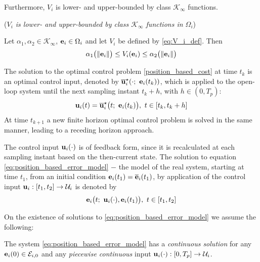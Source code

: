 Furthermore, $V_i$ is lower- and upper-bounded by class $\mathcal{K}_{\infty}$ functions.

\begin{bw_box}
  \begin{lemma} (\textit{$V_i$ is lower- and upper-bounded by class
      \label{lemma:V_i_lower_upper_bounded}
    $\mathcal{K}_{\infty}$ functions in $\Omega_i$})
  \end{lemma}

  Let $\alpha_1, \alpha_2 \in \mathcal{K}_{\infty}$, $\bm{\mathbf{e}}_i \in \Omega_i$
  and let $V_i$ be defined by \eqref{eq:V_i_def}. Then
  \begin{align}
    \alpha_1\big(\|\bm{\mathbf{e}}_i\|\big) \leq V_i(\bm{\mathbf{e}}_i) \leq \alpha_2\big(\| \bm{\mathbf{e}}_i \|\big)
  \end{align}

\end{bw_box}


The solution to the optimal control problem \eqref{position_based_cost}
at time $t_k$ is an optimal control input, denoted by
$\overline{\bm{\mathbf{u}}}_i^{\star}(\cdot;\ \bm{\mathbf{e}}_i(t_k))$, which
is applied to the open-loop system until the next sampling instant $t_k + h$,
with $h \in (0,T_p)$:
\begin{align}
  \bm{\mathbf{u}}_i(t) = \overline{\bm{\mathbf{u}}}_i^{\star}\big(t;\ \bm{\mathbf{e}}_i(t_k)\big),\  t \in [t_k, t_k + h]
 \label{eq:position_based_optimal_u}
\end{align}
At time $t_{k+1}$ a new finite horizon optimal control problem is solved in the
same manner, leading to a receding horizon approach.

The control input $\bm{\mathbf{u}}_i(\cdot)$ is of feedback form,
since it is recalculated at each sampling instant based on the then-current
state. The solution to equation \eqref{eq:position_based_error_model} $-$ the
model of the real system, starting at time $t_1$, from an initial condition
$\bm{\mathbf{e}}_i(t_1) = \overline{\bm{\mathbf{e}}}_i(t_1)$,
by application of the control input $\bm{\mathbf{u}}_i : [t_1, t_2] \to \mathcal{U}_i$
is denoted by
\begin{align}
  \bm{\mathbf{e}}_i\big(t;\ \bm{\mathbf{u}}_i(\cdot), \bm{\mathbf{e}}_i(t_1)\big),\ t \in [t_1, t_2]
\end{align}


On the existence of solutions to \eqref{eq:position_based_error_model} we
assume the following:
\begin{bw_box}
\begin{assumption}
  \label{ass:existence_of_solutions_without_disturbance}

  The system \eqref{eq:position_based_error_model} has a
  \textit{continuous solution} for any $\bm{\mathbf{e}}_i(0) \in \mathcal{E}_{i,0}$ and
  any \textit{piecewise continuous} input
  $\bm{\mathbf{u}}_i(\cdot) :[0,T_p] \to \mathcal{U}_i$.
\end{assumption}
\end{bw_box}

